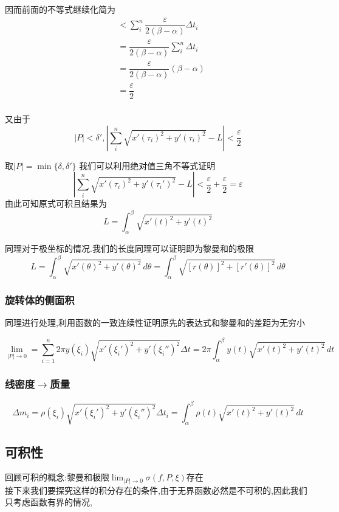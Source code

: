 \documentclass[11pt,hyperref,a4paper,UTF8]{ctexart}
\newcommand{\abs}[1]{\left|#1\right|}
\begin{document}
\begin{CJK}{UTF8}{gkai}
因而前面的不等式继续化简为
\[
\begin{aligned}  
&< \sum_i^n \dfrac{\varepsilon}{2(\beta - \alpha)} \Delta t_i\\
&=\dfrac{\varepsilon}{2(\beta - \alpha)} \sum_i^n \Delta t_i\\
&=\dfrac{\varepsilon}{2(\beta - \alpha)} (\beta - \alpha)\\
&=\dfrac{\varepsilon}{2}\\
\end{aligned}
\]

又由于\[|P| < \delta',\abs{\sum_i^n\sqrt{x'(\tau_i)^2 + y'(\tau_i)^2} - L }< \dfrac{\varepsilon}{2}\]

取$|P| = \min\{\delta,\delta'\}$
我们可以利用绝对值三角不等式证明
\[\abs{\sum_i^n\sqrt{x'(\tau_i)^2 + y'(\tau_i')^2} - L}< \dfrac{\varepsilon}{2} +\dfrac{\varepsilon}{2} = \varepsilon \]
由此可知原式可积且结果为
\[L =\int_{\alpha}^{\beta} \sqrt{x'(t)^2 + y'(t)^2}\]

同理对于极坐标的情况.我们的长度同理可以证明即为黎曼和的极限
\[ L = \int_{\alpha}^{\beta} \sqrt{x'(\theta)^2  + y'(\theta)^2}\, d\theta = \int_{\alpha}^{\beta} \sqrt{[r(\theta)]^2  + [r'(\theta)]^2}\, d\theta\]

\subsubsection{旋转体的侧面积}
同理进行处理,利用函数的一致连续性证明原先的表达式和黎曼和的差距为无穷小

\[\lim_{|P|\to 0} = \sum_{i = 1}^{n} 2\pi y(\xi_i)\sqrt{x'(\xi_i')^2 + y'(\xi_i'')^2} \Delta t = 2 \pi \int_{\alpha}^{\beta}y(t)\sqrt{x'(t)^2 + y'(t)^2}\, dt\]

\subsubsection{线密度$\rightarrow$质量}
\[\Delta m_i = \rho(\xi_i)\sqrt{x'(\xi_i')^2 + y'(\xi_i'')^2}\Delta t_i = \int_{\alpha}^{\beta} \rho(t) \sqrt{x'(t)^2 + y'(t)^2}\, dt\]

\subsection{可积性}
回顾可积的概念:黎曼和极限$\lim_{|P|\to 0} \sigma(f,P,\xi)$存在\\

接下来我们要探究这样的积分存在的条件,由于无界函数必然是不可积的,因此我们只考虑函数有界的情况,


\end{CJK}
\end{document}
